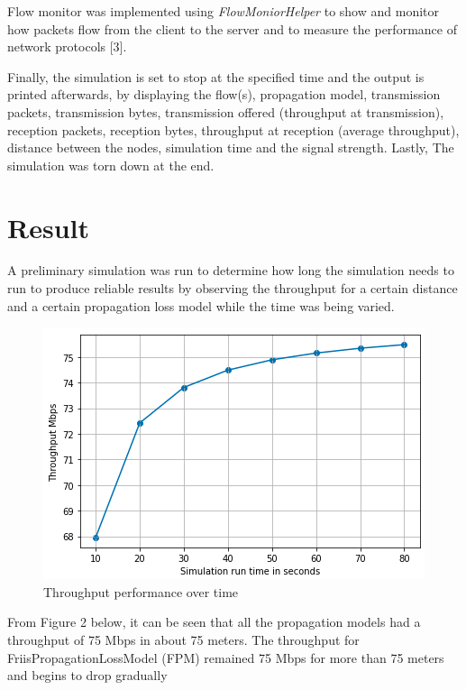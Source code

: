 \documentclass[a4paper, twocolumn, twoside, 12pt]{article}
\begin{document}
Flow monitor was implemented using \textit{FlowMoniorHelper} to show and monitor how packets flow from the client to the server and to measure the performance of network protocols [3].

Finally, the simulation is set to stop at the specified time and the output is printed afterwards, by displaying the flow(s), propagation model, transmission packets, transmission bytes, transmission offered (throughput at transmission), reception packets, reception bytes, throughput at reception (average throughput), distance between the nodes, simulation time and the signal strength. Lastly, The simulation was torn down at the end.

\section{Result \vspace{-0.2em}}
A preliminary simulation was run to determine how long the simulation needs to run to produce reliable results by observing the throughput for a certain distance and a certain propagation loss model while the time was being varied.

 \begin{figure}[h]
    \centering
    \includegraphics[width=1\linewidth]{timePlt.png}
    \caption {Throughput performance over time\vspace{-0.8em}}
    \label{fig:GeneralDiagram}
 \end{figure}

From Figure 2 below, it can be seen that all the propagation models had a throughput of 75 Mbps in about 75 meters. The throughput for FriisPropagationLossModel (FPM) remained 75 Mbps for more than 75 meters and begins to drop gradually
\end{document}
